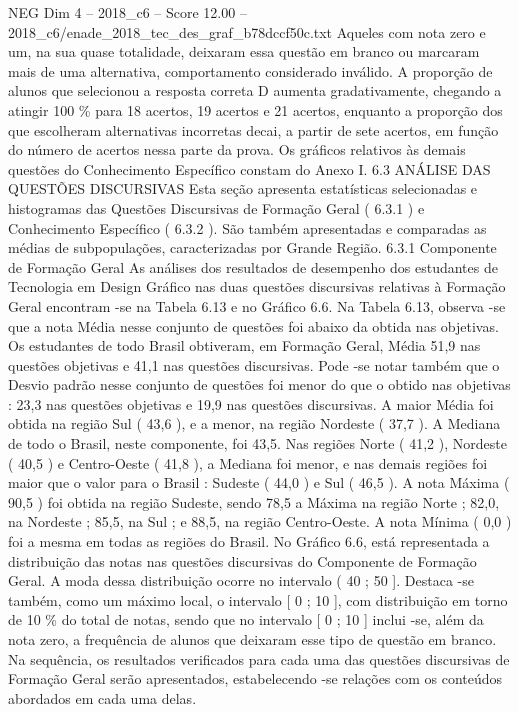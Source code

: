 \begin{textsample}{NEG Dim 4 – 2018\_c6 – Score 12.00 – 2018\_c6/enade\_2018\_tec\_des\_graf\_b78dccf50c.txt}
Aqueles com nota zero e um, na sua quase totalidade, deixaram essa questão em branco ou marcaram mais de uma alternativa, comportamento considerado inválido.
A proporção de alunos que selecionou a resposta correta D aumenta gradativamente, chegando a atingir 100 \% para 18 acertos, 19 acertos e 21 acertos, enquanto a proporção dos que escolheram alternativas incorretas decai, a partir de sete acertos, em função do número de acertos nessa parte da prova.
Os gráficos relativos às demais questões do Conhecimento Específico constam do Anexo I. 6.3 ANÁLISE DAS QUESTÕES DISCURSIVAS Esta seção apresenta estatísticas selecionadas e histogramas das Questões Discursivas de Formação Geral ( 6.3.1 ) e Conhecimento Específico ( 6.3.2 ).
São também apresentadas e comparadas as médias de subpopulações, caracterizadas por Grande Região. 6.3.1 Componente de Formação Geral As análises dos resultados de desempenho dos estudantes de Tecnologia em Design Gráfico nas duas questões discursivas relativas à Formação Geral encontram -se na Tabela 6.13 e no Gráfico 6.6.
Na Tabela 6.13, observa -se que a nota Média nesse conjunto de questões foi abaixo da obtida nas objetivas.
Os estudantes de todo Brasil obtiveram, em Formação Geral, Média 51,9 nas questões objetivas e 41,1 nas questões discursivas.
Pode -se notar também que o Desvio padrão nesse conjunto de questões foi menor do que o obtido nas objetivas : 23,3 nas questões objetivas e 19,9 nas questões discursivas.
A maior Média foi obtida na região Sul ( 43,6 ), e a menor, na região Nordeste ( 37,7 ).
A Mediana de todo o Brasil, neste componente, foi 43,5.
Nas regiões Norte ( 41,2 ), Nordeste ( 40,5 ) e Centro-Oeste ( 41,8 ), a Mediana foi menor, e nas demais regiões foi maior que o valor para o Brasil : Sudeste ( 44,0 ) e Sul ( 46,5 ).
A nota Máxima ( 90,5 ) foi obtida na região Sudeste, sendo 78,5 a Máxima na região Norte ; 82,0, na Nordeste ; 85,5, na Sul ; e 88,5, na região Centro-Oeste.
A nota Mínima ( 0,0 ) foi a mesma em todas as regiões do Brasil.
No Gráfico 6.6, está representada a distribuição das notas nas questões discursivas do Componente de Formação Geral.
A moda dessa distribuição ocorre no intervalo ( 40 ; 50 ].
Destaca -se também, como um máximo local, o intervalo [ 0 ; 10 ], com distribuição em torno de 10 \% do total de notas, sendo que no intervalo [ 0 ; 10 ] inclui -se, além da nota zero, a frequência de alunos que deixaram esse tipo de questão em branco.
Na sequência, os resultados verificados para cada uma das questões discursivas de Formação Geral serão apresentados, estabelecendo -se relações com os conteúdos abordados em cada uma delas.

\end{textsample}
